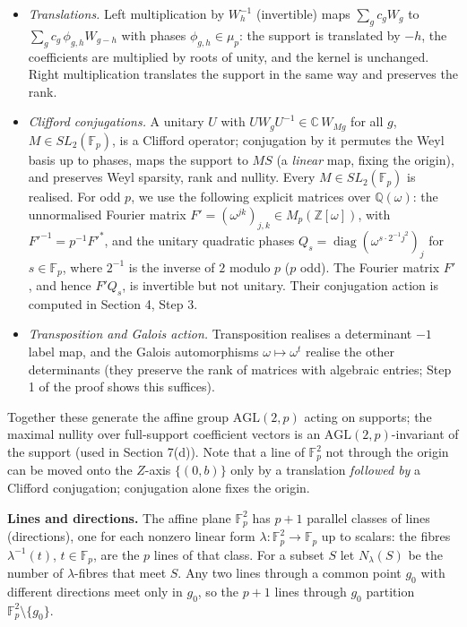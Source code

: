 \documentclass[
  11pt,
  a4paper,
]{article}
\providecommand{\tightlist}{%
  \setlength{\itemsep}{0pt}\setlength{\parskip}{0pt}}
\begin{document}
\begin{itemize}
\tightlist
\item
  \emph{Translations.} Left multiplication by \(W_h^{-1}\) (invertible)
  maps \(\sum_gc_gW_g\) to \(\sum_gc_g\,\allowbreak{}\phi_{g,\allowbreak{}h}W_{g-h}\) with phases
  \(\phi_{g,\allowbreak{}h}\in\mu_p\): the support is translated by \(-h\), the
  coefficients are multiplied by roots of unity, and the kernel is
  unchanged. Right multiplication translates the support in the same way
  and preserves the rank.
\item
  \emph{Clifford conjugations.} A unitary \(U\) with
  \(UW_gU^{-1}\in\mathbb C\,\allowbreak{}W_{Mg}\) for all \(g\),
  \(M\in SL_2(\mathbb F_p)\), is a Clifford operator; conjugation by it
  permutes the Weyl basis up to phases, maps the support to \(MS\) (a
  \emph{linear} map, fixing the origin), and preserves Weyl sparsity,
  rank and nullity. Every \(M\in SL_2(\mathbb F_p)\) is realised. For
  odd \(p\), we use the following explicit matrices over
  \(\mathbb Q(\omega)\): the unnormalised Fourier matrix
  \(F'=(\omega^{jk})_{j,\allowbreak{}k}\in M_p(\mathbb Z[\omega])\), with
  \(F'^{-1}=p^{-1}F'^*\), and the unitary quadratic phases
  \(Q_s=\operatorname{diag}(\omega^{s\cdot2^{-1}j^2})_j\) for
  \(s\in\mathbb F_p\), where \(2^{-1}\) is the inverse of \(2\) modulo
  \(p\) (\(p\) odd). The Fourier matrix \(F'\), and hence \(F'Q_s\), is
  invertible but not unitary. Their conjugation action is computed in
  Section 4, Step 3.
\item
  \emph{Transposition and Galois action.} Transposition realises a
  determinant \(-1\) label map, and the Galois automorphisms
  \(\omega\mapsto\omega^t\) realise the other determinants (they
  preserve the rank of matrices with algebraic entries; Step 1 of the
  proof shows this suffices).
\end{itemize}

Together these generate the affine group \(\mathrm{AGL}(2,\allowbreak{}p)\) acting on
supports; the maximal nullity over full-support coefficient vectors is
an \(\mathrm{AGL}(2,\allowbreak{}p)\)-invariant of the support (used in Section
7(d)). Note that a line of \(\mathbb F_p^2\) not through the origin can
be moved onto the \(Z\)-axis \(\{(0,\allowbreak{}b)\}\) only by a translation
\emph{followed by} a Clifford conjugation; conjugation alone fixes the
origin.

\textbf{Lines and directions.} The affine plane \(\mathbb F_p^2\) has
\(p+1\) parallel classes of lines (directions), one for each nonzero
linear form \(\lambda:\mathbb F_p^2\to\mathbb F_p\) up to scalars: the
fibres \(\lambda^{-1}(t)\), \(t\in\mathbb F_p\), are the \(p\) lines of
that class. For a subset \(S\) let \(N_\lambda(S)\) be the number of
\(\lambda\)-fibres that meet \(S\). Any two lines through a common point
\(g_0\) with different directions meet only in \(g_0\), so the \(p+1\)
lines through \(g_0\) partition \(\mathbb F_p^2\setminus\{g_0\}\).
\end{document}
